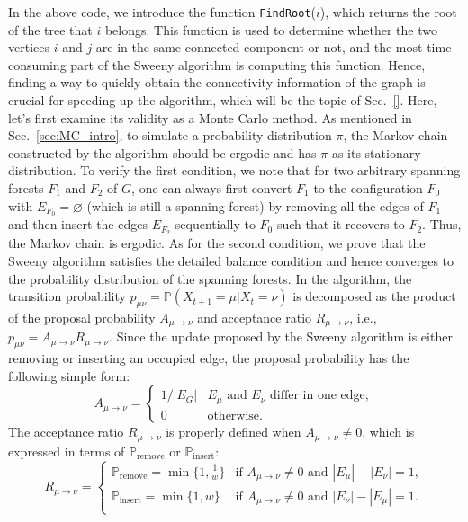 In the above code, we introduce the function \texttt{FindRoot}($i$), which returns the root of the tree that $i$ belongs.
This function is used to determine whether the two vertices $i$ and $j$ are in the same connected component or not, and
the most time-consuming part of the Sweeny algorithm is computing this function. Hence, finding a way to quickly
obtain the connectivity information of the graph is crucial for speeding up the algorithm, which will be the
topic of Sec.~\ref{}. Here, let's first examine its validity as a Monte Carlo method. As mentioned in Sec.~\ref{sec:MC_intro},
to simulate a probability distribution $\pi$, the Markov chain constructed by the algorithm should be ergodic
and has $\pi$ as its stationary distribution. To verify the first condition, we note that for two arbitrary spanning forests
$F_1$ and $F_2$ of $G$, one can always first convert $F_1$ to the configuration $F_0$ with $E_{F_0} = \varnothing$ (which is
still a spanning forest) by removing all the edges of $F_1$ and then insert the edges $E_{F_2}$ sequentially to $F_0$ 
such that it recovers to $F_2$. Thus, the Markov chain is ergodic. As for the second condition, we prove that the Sweeny algorithm satisfies the detailed
balance condition and hence converges to the probability distribution of the spanning forests. In the algorithm, the transition 
probability $p_{\mu \nu} = \mathbb{P}(X_{t+1} = \mu|X_t = \nu)$ is decomposed as the product of the proposal probability $A_{\mu\to\nu}$ and acceptance
ratio $R_{\mu\to\nu}$, i.e., $p_{\mu \nu} = A_{\mu\to\nu}R_{\mu\to \nu}$. Since the update proposed by the Sweeny algorithm is either
removing or inserting an occupied edge, the proposal probability has the following simple form:
\begin{equation}\label{eq:proposal_prob}
  A_{\mu \to \nu} = 
  \begin{cases}
    1/|E_G|  & E_{\mu} \text{ and } E_{\nu} \text{ differ in one edge}, \\
    0        & \text{otherwise}.
  \end{cases}
\end{equation}
The acceptance ratio $R_{\mu \to \nu}$ is properly defined when $A_{\mu \to \nu} \neq 0$, which is expressed in terms of $\mathbb{P}_{\text{remove}}$ or $\mathbb{P}_{\text{insert}}$:
\begin{equation}\label{eq:acc_ratio}
  R_{\mu \to \nu} = 
  \begin{cases}
    \mathbb{P}_{\text{remove}} = \min\{1, \frac{1}{w}\} & \text{if } A_{\mu\to\nu} \neq 0 \text{ and } |E_\mu| - |E_\nu| = 1,\\
    \mathbb{P}_{\text{insert}} = \min\{1, w\}& \text{if } A_{\mu\to\nu} \neq 0 \text{ and } |E_\nu| - |E_\mu| = 1.\\
  \end{cases}
\end{equation}
